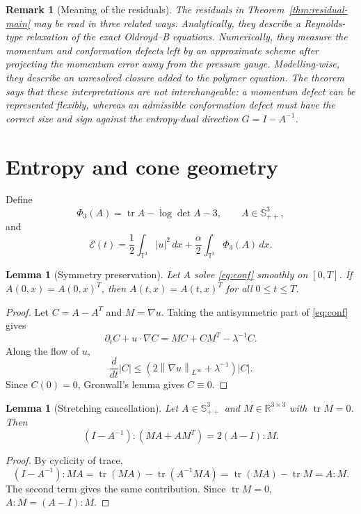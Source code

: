 \documentclass[11pt]{article}
\numberwithin{equation}{section}
\newtheorem{lemma}[theorem]{Lemma}
\newtheorem{remark}[theorem]{Remark}
\newcommand{\T}{\mathbb T}
\newcommand{\R}{\mathbb R}
\newcommand{\Id}{I}
\newcommand{\Spp}{\mathbb S_{++}}
\newcommand{\tr}{\operatorname{tr}}
\newcommand{\calE}{\mathcal E}
\newcommand{\norm}[1]{\left\lVert #1\right\rVert}
\begin{document}
\begin{remark}[Meaning of the residuals]
The residuals in Theorem~\ref{thm:residual-main} may be read in three related
ways.  Analytically, they describe a Reynolds-type relaxation of the exact
Oldroyd--B equations.  Numerically, they measure the momentum and conformation
defects left by an approximate scheme after projecting the momentum error away
from the pressure gauge.  Modelling-wise, they describe an unresolved closure
added to the polymer equation.  The theorem says that these interpretations
are not interchangeable: a momentum defect can be represented flexibly, whereas
an admissible conformation defect must have the correct size and sign against
the entropy-dual direction \(G=\Id-A^{-1}\).
\end{remark}

\section{Entropy and cone geometry}

Define
\[
  \Phi_3(A)=\tr A-\log\det A-3,\qquad A\in\Spp^3,
\]
and
\[
  \calE(t)=
  \frac12\int_{\T^3}|u|^2\,dx
  +\frac{\alpha}{2}\int_{\T^3}\Phi_3(A)\,dx .
\]

\begin{lemma}[Symmetry preservation]
\label{lem:symmetry}
Let \(A\) solve \eqref{eq:conf} smoothly on \([0,T]\).  If
\(A(0,x)=A(0,x)^T\), then \(A(t,x)=A(t,x)^T\) for all \(0\le t\le T\).
\end{lemma}

\begin{proof}
Let \(C=A-A^T\) and \(M=\nabla u\).  Taking the antisymmetric part of
\eqref{eq:conf} gives
\[
  \partial_tC+u\cdot\nabla C
  =
  MC+CM^T-\lambda^{-1}C .
\]
Along the flow of \(u\),
\[
  \frac{d}{dt}|C|
  \le
  (2\norm{\nabla u}_{L^\infty}+\lambda^{-1})|C|.
\]
Since \(C(0)=0\), Gronwall's lemma gives \(C\equiv0\).
\end{proof}

\begin{lemma}[Stretching cancellation]
\label{lem:cancellation}
Let \(A\in\Spp^3\) and \(M\in\R^{3\times3}\) with \(\tr M=0\).  Then
\[
  (\Id-A^{-1}):(MA+AM^T)=2(A-\Id):M .
\]
\end{lemma}

\begin{proof}
By cyclicity of trace,
\[
  (\Id-A^{-1}):MA=\tr(MA)-\tr(A^{-1}MA)=\tr(MA)-\tr M=A:M .
\]
The second term gives the same contribution.  Since \(\tr M=0\),
\(A:M=(A-\Id):M\).
\end{proof}
\end{document}
